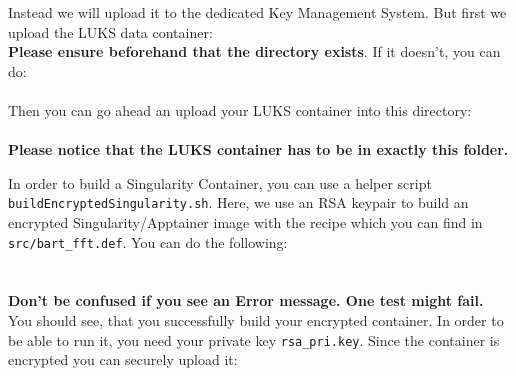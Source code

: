 \documentclass[paper=a4]{scrartcl}
\begin{document}
Instead we will upload it to the dedicated Key Management System. 
But first we upload the LUKS data container:\\
\textbf{Please ensure beforehand that the directory exists}.
If it doesn't, you can do: \\
 \\
Then you can go ahead an upload your LUKS container into this directory: \\
 \\
\textbf{Please notice that the LUKS container has to be in exactly this folder.}

In order to build a Singularity Container, you can use a helper script \texttt{buildEncryptedSingularity.sh}. 
Here, we use an RSA keypair to build an encrypted Singularity/Apptainer image with the recipe which you can find in \texttt{src/bart\_fft.def}. 
You can do the following: \\
 \\
 \\
\textbf{Don't be confused if you see an Error message. One test might fail.} \\
You should see, that you successfully build your encrypted container. In order to be able to run it, you need your private key \texttt{rsa\_pri.key}. 
Since the container is encrypted you can securely upload it: \\
 \\
\end{document}
